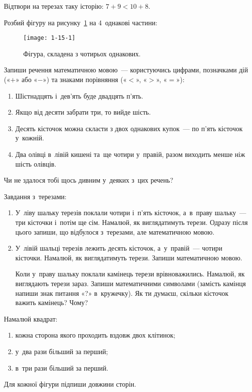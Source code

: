 \problem
Відтвори на терезах таку історію: $7+9 < 10+8$.


\problem
Розбий фігуру на рисунку~\ref{fig:figure-from-four-parts} на 4~однакові частини:

\begin{figure}[ht]
  \centering
  \texttt{[image: 1-15-1]}
  \caption{Фігура, складена з чотирьох однакових.}
  \label{fig:figure-from-four-parts}
\end{figure}


\problem
Запиши речення математичною мовою~--- користуючись цифрами,
позначками дій («$+$» або «$-$») та знаками порівняння («$<$», «$>$», «$=$»):
\begin{enumerate}
  \item Шістнадцять і~дев'ять буде двадцять п'ять.
  \item Якщо від десяти забрати три, то вийде шість.
  \item Десять кісточок можна скласти з двох однакових купок~---
  по п'ять кісточок у~кожній.
  \item Два олівці в~лівій кишені та~ще чотири у~правій,
  разом виходить менше ніж шість олівців.
\end{enumerate}
Чи не здалося тобі щось дивним у~деяких з~цих речень?

\problem
Завдання з~терезами:
\begin{enumerate}
  \item У~ліву шальку терезів поклали чотири і~п'ять кісточок,
  а~в~праву шальку~--- три кісточки і~потім ще сім.
  Намалюй, як виглядатимуть терези.
  Одразу після цього запиши, що відбулося з~терезами,
  але математичною мовою.
  \item У~лівій шальці терезів лежить десять кісточок,
  а~у~правій~--- чотири кісточки.
  Намалюй, як виглядатимуть терези. Запиши математичною мовою.

  Коли у~праву шальку поклали камінець терези врівноважились.
  Намалюй, як виглядають терези зараз.
  Запиши математичними символами
  (замість камінця напиши знак питання «?» в~кружечку).
  Як ти думаєш, скільки кісточок важить камінець? Чому?
\end{enumerate}


\problem
Намалюй квадрат:
\begin{enumerate}
  \item кожна сторона якого проходить вздовж двох клітинок;
  \item у~два рази більший за перший;
  \item в~три рази більший за перший.
\end{enumerate}
Для кожної фігури підпиши довжини сторін.


